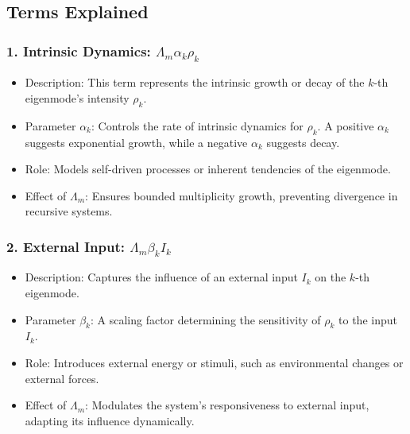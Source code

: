 \documentclass{article}
\theoremstyle{plain}
\begin{document}
\subsection{Terms Explained}

\subsubsection{1. Intrinsic Dynamics: \( \Lambda_m \alpha_k \rho_k \)}
\begin{itemize}
    \item Description: This term represents the intrinsic growth or decay of the \( k \)-th eigenmode’s intensity \( \rho_k \).
    \item Parameter \( \alpha_k \): Controls the rate of intrinsic dynamics for \( \rho_k \). A positive \( \alpha_k \) suggests exponential growth, while a negative \( \alpha_k \) suggests decay.
    \item Role: Models self-driven processes or inherent tendencies of the eigenmode.
    \item Effect of \( \Lambda_m \): Ensures bounded multiplicity growth, preventing divergence in recursive systems.
\end{itemize}

\subsubsection{2. External Input: \( \Lambda_m \beta_k I_k \)}
\begin{itemize}
    \item Description: Captures the influence of an external input \( I_k \) on the \( k \)-th eigenmode.
    \item Parameter \( \beta_k \): A scaling factor determining the sensitivity of \( \rho_k \) to the input \( I_k \).
    \item Role: Introduces external energy or stimuli, such as environmental changes or external forces.
    \item Effect of \( \Lambda_m \): Modulates the system’s responsiveness to external input, adapting its influence dynamically.
\end{itemize}
\end{document}
